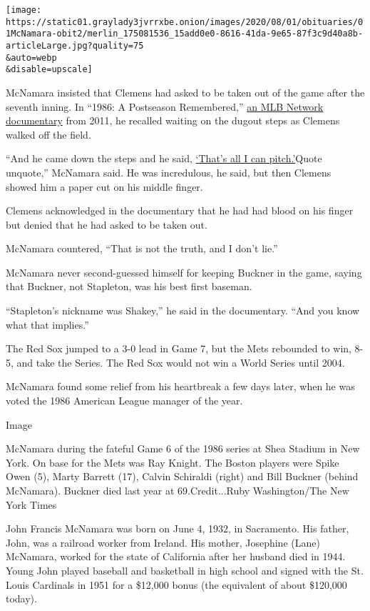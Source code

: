 \texttt{[image: https://static01.graylady3jvrrxbe.onion/images/2020/08/01/obituaries/01McNamara-obit2/merlin\_175081536\_15add0e0-8616-41da-9e65-87f3c9d40a8b-articleLarge.jpg?quality=75\\\&auto=webp\\\&disable=upscale]}

McNamara insisted that Clemens had asked to be taken out of the game
after the seventh inning. In ``1986: A Postseason Remembered,''
\href{https://www.mlb.com/news/network-recalls-1986-postseason/c-25882718\#:~:text=9\%20at\%209\%20p.m.\%20ET,-November\%203\%2C\%202011\&text=After\%20one\%20of\%20the\%20most,9\%20at\%209\%20p.m.\%20ET.}{an
MLB Network documentary} from 2011, he recalled waiting on the dugout
steps as Clemens walked off the field.

``And he came down the steps and he said,
\href{https://www.nytimes3xbfgragh.onion/2011/11/08/sports/baseball/former-red-sox-manager-john-mcnamara-recalls-final-out-that-wasnt-to-be.html}{`That's
all I can pitch.'}Quote unquote,'' McNamara said. He was incredulous, he
said, but then Clemens showed him a paper cut on his middle finger.

Clemens acknowledged in the documentary that he had had blood on his
finger but denied that he had asked to be taken out.

McNamara countered, ``That is not the truth, and I don't lie.''

McNamara never second-guessed himself for keeping Buckner in the game,
saying that Buckner, not Stapleton, was his best first baseman.

``Stapleton's nickname was Shakey,'' he said in the documentary. ``And
you know what that implies.''

The Red Sox jumped to a 3-0 lead in Game 7, but the Mets rebounded to
win, 8-5, and take the Series. The Red Sox would not win a World Series
until 2004.

McNamara found some relief from his heartbreak a few days later, when he
was voted the 1986 American League manager of the year.

Image

McNamara during the fateful Game 6 of the 1986 series at Shea Stadium in
New York. On base for the Mets was Ray Knight. The Boston players were
Spike Owen (5), Marty Barrett (17), Calvin Schiraldi (right) and Bill
Buckner (behind McNamara). Buckner died last year at 69.Credit...Ruby
Washington/The New York Times

John Francis McNamara was born on June 4, 1932, in Sacramento. His
father, John, was a railroad worker from Ireland. His mother, Josephine
(Lane) McNamara, worked for the state of California after her husband
died in 1944. Young John played baseball and basketball in high school
and signed with the St. Louis Cardinals in 1951 for a \$12,000 bonus
(the equivalent of about \$120,000 today).

